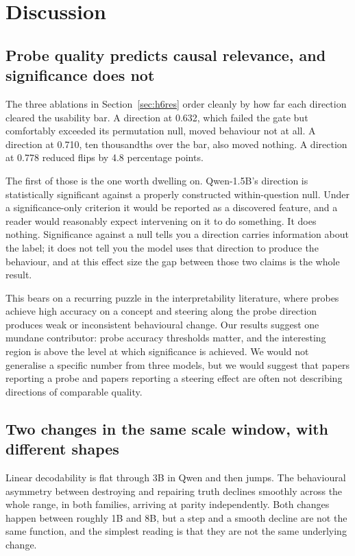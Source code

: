 
\section{Discussion}

\subsection{Probe quality predicts causal relevance, and significance does not}

The three ablations in Section~\ref{sec:h6res} order cleanly by how far each direction
cleared the usability bar. A direction at 0.632, which failed the gate but comfortably
exceeded its permutation null, moved behaviour not at all. A direction at 0.710, ten
thousandths over the bar, also moved nothing. A direction at 0.778 reduced flips by 4.8
percentage points.

The first of those is the one worth dwelling on. Qwen-1.5B's direction is statistically
significant against a properly constructed within-question null. Under a
significance-only criterion it would be reported as a discovered feature, and a reader
would reasonably expect intervening on it to do something. It does nothing. Significance
against a null tells you a direction carries information about the label; it does not tell
you the model uses that direction to produce the behaviour, and at this effect size the gap
between those two claims is the whole result.

This bears on a recurring puzzle in the interpretability literature, where probes achieve
high accuracy on a concept and steering along the probe direction produces weak or
inconsistent behavioural change. Our results suggest one mundane contributor: probe
accuracy thresholds matter, and the interesting region is above the level at which
significance is achieved. We would not generalise a specific number from three models, but
we would suggest that papers reporting a probe and papers reporting a steering effect are
often not describing directions of comparable quality.

\subsection{Two changes in the same scale window, with different shapes}

Linear decodability is flat through 3B in Qwen and then jumps. The behavioural asymmetry
between destroying and repairing truth declines smoothly across the whole range, in both
families, arriving at parity independently. Both changes happen between roughly 1B and 8B,
but a step and a smooth decline are not the same function, and the simplest reading is that
they are not the same underlying change.

